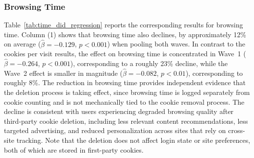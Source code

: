 \documentclass[12pt]{article}
\theoremstyle{definition}
\theoremstyle{remark}
\begin{document}
\begin{appendix}
\subsubsection{Browsing Time}
\label{sec:time_did}

Table~\ref{tab:time_did_regression} reports the corresponding results for browsing time. Column (1) shows that browsing time also declines, by approximately 12\% on average ($\hat{\beta} = -0.129$, $p < 0.001$) when pooling both waves. In contrast to the cookies per visit results, the effect on browsing time is concentrated in Wave~1 ($\hat{\beta} = -0.264$, $p < 0.001$), corresponding to a roughly 23\% decline, while the Wave~2 effect is smaller in magnitude ($\hat{\beta} = -0.082$, $p < 0.01$), corresponding to roughly 8\%. The reduction in browsing time provides independent evidence that the deletion process is taking effect, since browsing time is logged separately from cookie counting and is not mechanically tied to the cookie removal process. The decline is consistent with users experiencing degraded browsing quality after third-party cookie deletion, including less relevant content recommendations, less targeted advertising, and reduced personalization across sites that rely on cross-site tracking. Note that the deletion does not affect login state or site preferences, both of which are stored in first-party cookies.


\end{appendix}
\end{document}

